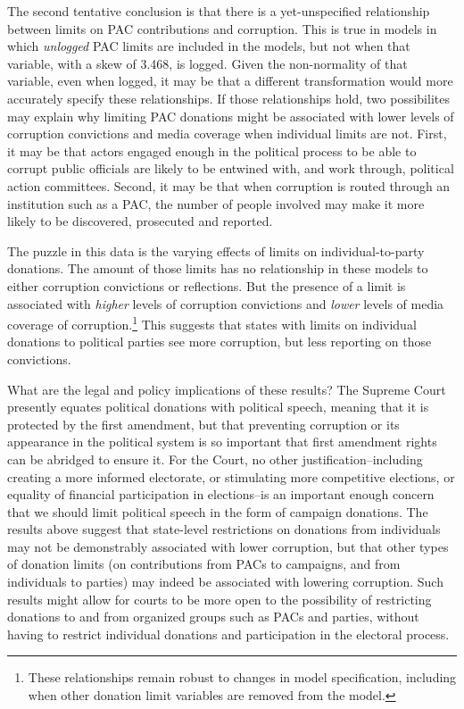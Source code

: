 \documentclass{jopsubmission}
\begin{document}
The second tentative conclusion is that there is a yet-unspecified
relationship between limits on PAC contributions and corruption. This is
true in models in which \emph{unlogged} PAC limits are included in the
models, but not when that variable, with a skew of 3.468, is logged.
Given the non-normality of that variable, even when logged, it may be
that a different transformation would more accurately specify these
relationships. If those relationships hold, two possibilites may explain
why limiting PAC donations might be associated with lower levels of
corruption convictions and media coverage when individual limits are
not. First, it may be that actors engaged enough in the political
process to be able to corrupt public officials are likely to be entwined
with, and work through, political action committees. Second, it may be
that when corruption is routed through an institution such as a PAC, the
number of people involved may make it more likely to be discovered,
prosecuted and reported.

The puzzle in this data is the varying effects of limits on
individual-to-party donations. The amount of those limits has no
relationship in these models to either corruption convictions or
reflections. But the presence of a limit is associated with
\emph{higher} levels of corruption convictions and \emph{lower} levels
of media coverage of corruption.\footnote{These relationships remain
  robust to changes in model specification, including when other
  donation limit variables are removed from the model.} This suggests
that states with limits on individual donations to political parties see
more corruption, but less reporting on those convictions.

What are the legal and policy implications of these results? The Supreme
Court presently equates political donations with political speech,
meaning that it is protected by the first amendment, but that preventing
corruption or its appearance in the political system is so important
that first amendment rights can be abridged to ensure it. For the Court,
no other justification--including creating a more informed electorate,
or stimulating more competitive elections, or equality of financial
participation in elections--is an important enough concern that we
should limit political speech in the form of campaign donations. The
results above suggest that state-level restrictions on donations from
individuals may not be demonstrably associated with lower corruption,
but that other types of donation limits (on contributions from PACs to
campaigns, and from individuals to parties) may indeed be associated
with lowering corruption. Such results might allow for courts to be more
open to the possibility of restricting donations to and from organized
groups such as PACs and parties, without having to restrict individual
donations and participation in the electoral process.
\end{document}
